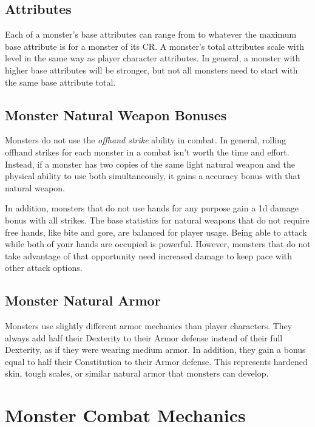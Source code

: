     \subsection{Attributes}
        Each of a monster's base attributes can range from  to whatever the maximum base attribute is for a monster of its CR.
        A monster's total attributes scale with level in the same way as player character attributes.
        In general, a monster with higher base attributes will be stronger, but not all monsters need to start with the same base attribute total.

    \subsection{Monster Natural Weapon Bonuses}\label{Monster Natural Weapon Bonuses}
        Monsters do not use the \textit{offhand strike} ability in combat.
        In general, rolling offhand strikes for each monster in a combat isn't worth the time and effort.
        Instead, if a monster has two copies of the same light natural weapon and the physical ability to use both simultaneously, it gains a  accuracy bonus with that natural weapon.

        In addition, monsters that do not use hands for any purpose gain a \plus1d damage bonus with all strikes.
        The base statistics for natural weapons that do not require free hands, like bite and gore, are balanced for player usage.
        Being able to attack while both of your hands are occupied is powerful.
        However, monsters that do not take advantage of that opportunity need increased damage to keep pace with other attack options.

    \subsection{Monster Natural Armor}\label{Monster Natural Armor}
        Monsters use slightly different armor mechanics than player characters.
        They always add half their Dexterity to their Armor defense instead of their full Dexterity, as if they were wearing medium armor.
        In addition, they gain a bonus equal to half their Constitution to their Armor defense.
        This represents hardened skin, tough scales, or similar natural armor that monsters can develop.

\section{Monster Combat Mechanics}

